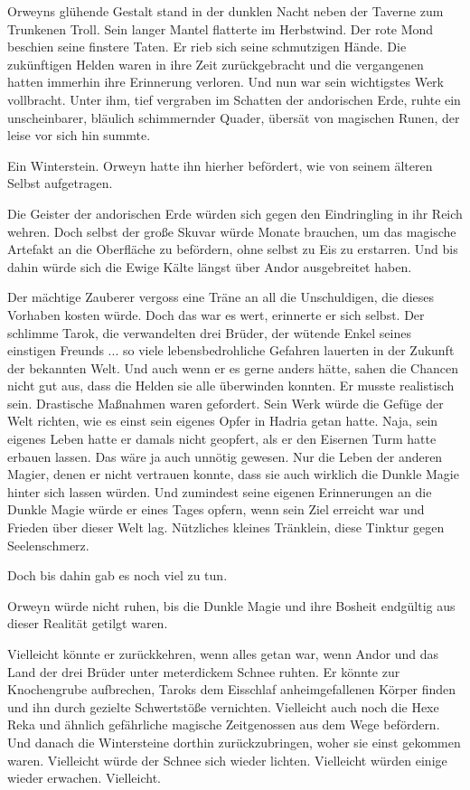 
Orweyns glühende Gestalt stand in der dunklen Nacht neben der Taverne zum Trunkenen Troll. Sein langer Mantel flatterte im Herbstwind. Der rote Mond beschien seine finstere Taten. Er rieb sich seine schmutzigen Hände. Die zukünftigen Helden waren in ihre Zeit zurückgebracht und die vergangenen hatten immerhin ihre Erinnerung verloren. Und nun war sein wichtigstes Werk vollbracht. Unter ihm, tief vergraben im Schatten der andorischen Erde, ruhte ein unscheinbarer, bläulich schimmernder Quader, übersät von magischen Runen, der leise vor sich hin summte. 

Ein Winterstein. Orweyn hatte ihn hierher befördert, wie von seinem älteren Selbst aufgetragen.

Die Geister der andorischen Erde würden sich gegen den Eindringling in ihr Reich wehren. Doch selbst der große Skuvar würde Monate brauchen, um das magische Artefakt an die Oberfläche zu befördern, ohne selbst zu Eis zu erstarren. Und bis dahin würde sich die Ewige Kälte längst über Andor ausgebreitet haben. 

Der mächtige Zauberer vergoss eine Träne an all die Unschuldigen, die dieses Vorhaben kosten würde. Doch das war es wert, erinnerte er sich selbst. Der schlimme Tarok, die verwandelten drei Brüder, der wütende Enkel seines einstigen Freunds ... so viele lebensbedrohliche Gefahren lauerten in der Zukunft der bekannten Welt. Und auch wenn er es gerne anders hätte, sahen die Chancen nicht gut aus, dass die Helden sie alle überwinden konnten. Er musste realistisch sein. Drastische Maßnahmen waren gefordert. Sein Werk würde die Gefüge der Welt richten, wie es einst sein eigenes Opfer in Hadria getan hatte. Naja, sein eigenes Leben hatte er damals nicht geopfert, als er den Eisernen Turm hatte erbauen lassen. Das wäre ja auch unnötig gewesen. Nur die Leben der anderen Magier, denen er nicht vertrauen konnte, dass sie auch wirklich die Dunkle Magie hinter sich lassen würden. Und zumindest seine eigenen Erinnerungen an die Dunkle Magie würde er eines Tages opfern, wenn sein Ziel erreicht war und Frieden über dieser Welt lag. Nützliches kleines Tränklein, diese Tinktur gegen Seelenschmerz. 

Doch bis dahin gab es noch viel zu tun.

Orweyn würde nicht ruhen, bis die Dunkle Magie und ihre Bosheit endgültig aus dieser Realität getilgt waren. 

Vielleicht könnte er zurückkehren, wenn alles getan war, wenn Andor und das Land der drei Brüder unter meterdickem Schnee ruhten. Er könnte zur Knochengrube aufbrechen, Taroks dem Eisschlaf anheimgefallenen Körper finden und ihn durch gezielte Schwertstöße vernichten. Vielleicht auch noch die Hexe Reka und ähnlich gefährliche magische Zeitgenossen aus dem Wege befördern. Und danach die Wintersteine dorthin zurückzubringen, woher sie einst gekommen waren. Vielleicht würde der Schnee sich wieder lichten. Vielleicht würden einige wieder erwachen. Vielleicht. 

